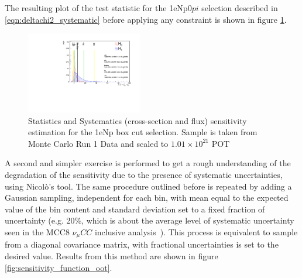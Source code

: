 \documentclass[a4paper]{article}
\newcommand{\numucc}{$\nu_{\mu} CC$ }
\begin{document}
The resulting plot of the test statistic for the 1eNp0$pi$ selection described in \ref{eqn:deltachi2_systematic} before applying any constraint is shown in figure \ref{fig:1eNp:box:statsystsensitivity}. 

\begin{figure}[H]
\begin{center}
\includegraphics[width=0.45\textwidth]{Sensitivity/SBNfit_Cls_nue_reco_e_genietune_run1_LEE_syst.pdf}
\caption{\label{fig:1eNp:box:statsystsensitivity} Statistics and Systematics (cross-section and flux) sensitivity estimation for the 1eNp box cut selection. Sample is taken from Monte Carlo Run 1 Data and scaled to $1.01\times10^21$ POT}
\end{center}
\end{figure}

A second and simpler exercise is performed to get a rough understanding of the degradation of the sensitivity due to the presence of systematic uncertainties, using Nicol\`o's tool.
The same procedure outlined before is repeated by adding a Gaussian sampling, independent for each bin, with mean equal to the expected value of the bin content and standard deviation set to a fixed fraction of uncertainty (e.g. 20\%, which is about the average level of systematic uncertainty seen in the MCC8 \numucc inclusive analysis~\cite{bib:numuCCincl}).
This process is equivalent to sample from a diagonal covariance matrix, with fractional uncertainties is set to the desired value.
Results from this method are shown in figure \ref{fig:sensitivity_function_oot}.
\end{document}

